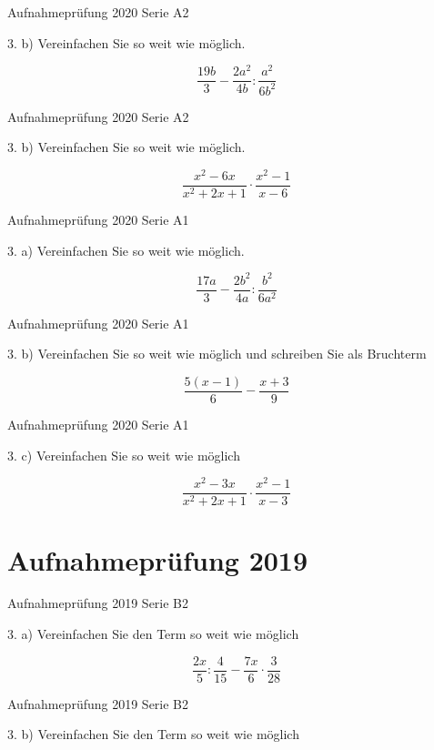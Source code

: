 {
Aufnahmeprüfung 2020 Serie A2

3. b) Vereinfachen Sie so weit wie möglich.

$$\frac{19b}{3} - \frac{2a^2}{4b} : \frac{a^2}{6b^2}$$

Aufnahmeprüfung 2020 Serie A2

3. b) Vereinfachen Sie so weit wie möglich.

$$\frac{x^2-6x}{x^2+2x+1} \cdot{} \frac{x^2-1}{x-6}$$

Aufnahmeprüfung 2020 Serie A1

3. a) Vereinfachen Sie so weit wie möglich.

$$\frac{17a}{3} - \frac{2b^2}{4a}  :   \frac{b^2}{6a^2}$$

Aufnahmeprüfung 2020 Serie A1

3. b) Vereinfachen Sie so weit wie möglich und schreiben Sie als Bruchterm

$$\frac{5(x-1)}{6} - \frac{x+3}{9}$$

Aufnahmeprüfung 2020 Serie A1

3. c) Vereinfachen Sie so weit wie möglich

$$\frac{x^2-3x}{x^2+2x+1} \cdot{} \frac{x^2-1}{x-3}$$

\section*{Aufnahmeprüfung 2019}
Aufnahmeprüfung 2019 Serie B2

3. a) Vereinfachen Sie den Term so weit wie möglich

$$\frac{2x}{5} : \frac{4}{15} - \frac{7x}{6} \cdot{} \frac{3}{28}$$

Aufnahmeprüfung 2019 Serie B2

3. b) Vereinfachen Sie den Term so weit wie möglich

}
